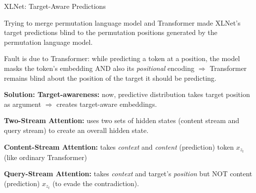 \begin{frame}{XLNet: Target-Aware Predictions}

    \vspace{10pt}

    \begin{itemizeSpaced}{10pt}
         Trying to merge permutation language model and Transformer made XLNet’s target predictions blind to the permutation positions generated by the permutation language model.

        \item Fault is due to Transformer: while predicting a token at a position, the model masks the token’s embedding AND also its \emph{positional} encoding $\Rightarrow$ Transformer remains blind about the position of the target it should be predicting. 
        
        
        \item {\color{ForestGreen} \textbf{Solution: Target-awareness: }} now, predictive distribution takes target position as argument $\Rightarrow$ creates target-aware embeddings. 
        
        
        \item {\color{ForestGreen} \textbf{Two-Stream Attention: }}uses two sets of hidden states (content stream and query stream) to create an overall hidden state. 
        
        \begin{itemizeSpaced}{5pt}
            \item \textbf{Content-Stream Attention: } takes \emph{context} and \emph{content} (prediction) token $x_{z_t}$ (like ordinary Transformer)
            
            \item \textbf{Query-Stream Attention: }takes \emph{context} and target's \emph{position} but NOT content (prediction) $x_{z_t}$ (to evade the contradiction). 
        \end{itemizeSpaced} 
        
    \end{itemizeSpaced}
\end{frame}


